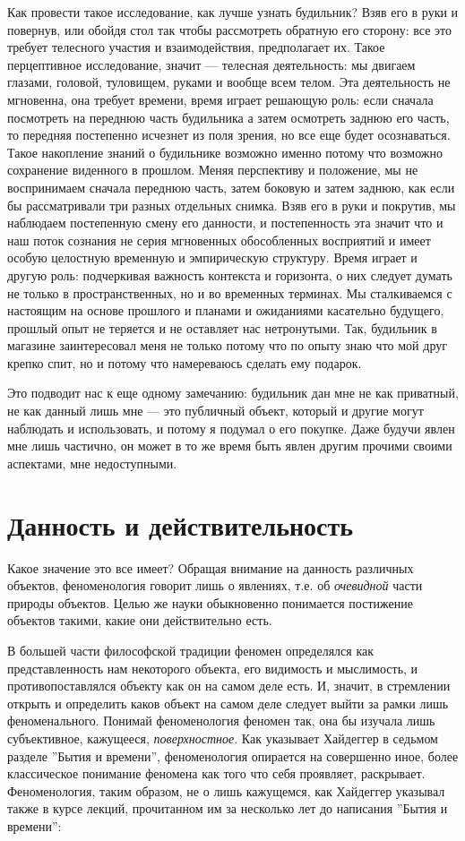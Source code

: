 \documentclass[11pt]{book}
\begin{document}
Как провести такое исследование, как лучше узнать будильник? Взяв его в руки и повернув, или обойдя стол так чтобы рассмотреть обратную его сторону: все это требует телесного участия и взаимодействия, предполагает их. Такое перцептивное исследование, значит --- телесная деятельность: мы двигаем глазами, головой, туловищем, руками и вообще всем телом. Эта деятельность не мгновенна, она требует времени, время играет решающую роль: если сначала посмотреть на переднюю часть будильника а затем осмотреть заднюю его часть, то передняя постепенно исчезнет из поля зрения, но все еще будет осознаваться. Такое накопление знаний о будильнике возможно именно потому что возможно сохранение виденного в прошлом. Меняя перспективу и положение, мы не воспринимаем сначала переднюю часть, затем боковую и затем заднюю, как если бы рассматривали три разных отдельных снимка. Взяв его в руки и покрутив, мы наблюдаем постепенную смену его данности, и постепенность эта значит что и наш поток сознания не серия мгновенных обособленных восприятий и имеет особую целостную временную и эмпирическую структуру. Время играет и другую роль: подчеркивая важность контекста и горизонта, о них следует думать не только в пространственных, но и во временных терминах. Мы сталкиваемся с настоящим на основе прошлого и планами и ожиданиями касательно будущего, прошлый опыт не теряется и не оставляет нас нетронутыми. Так, будильник в магазине заинтересовал меня не только потому что по опыту знаю что мой друг крепко спит, но и потому что намереваюсь сделать ему подарок.

Это подводит нас к еще одному замечанию: будильник дан мне не как приватный, не как данный лишь мне --- это публичный объект, который и другие могут наблюдать и использовать, и потому я подумал о его покупке. Даже будучи явлен мне лишь частично, он может в то же время быть явлен другим прочими своими аспектами, мне недоступными.

\section{Данность и действительность}

Какое значение это все имеет? Обращая внимание на данность различных объектов, феноменология говорит лишь о явлениях, т.е. об \textit{очевидной} части природы объектов. Целью же науки обыкновенно понимается постижение объектов такими, какие они действительно есть.

В большей части философской традиции феномен определялся как представленность нам некоторого объекта, его видимость и мыслимость, и противопоставлялся объекту как он на самом деле есть. И, значит, в стремлении открыть и определить каков объект на самом деле следует выйти за рамки лишь феноменального. Понимай феноменология феномен так, она бы изучала лишь субъективное, кажущееся, \textit{поверхностное}. Как указывает Хайдеггер в седьмом разделе ''Бытия и времени'', феноменология опирается на совершенно иное, более классическое понимание феномена как того что себя проявляет, раскрывает. Феноменология, таким образом, не о лишь кажущемся, как Хайдеггер указывал также в курсе лекций, прочитанном им за несколько лет до написания ''Бытия и времени'':
\end{document}
